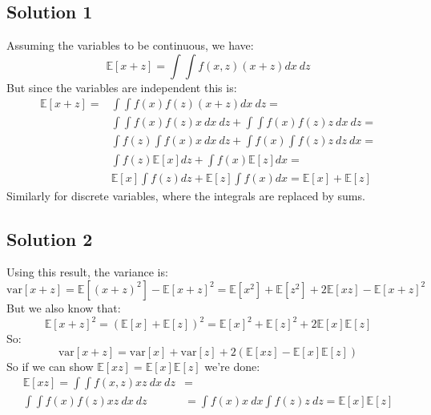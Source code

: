 \documentclass[12pt, a4paper]{article}
\numberwithin{equation}{section}
\begin{document}
\subsection{Solution 1}
Assuming the variables to be continuous, we have:
\begin{equation}
\mathbb{E}[x+z]=\int\int f(x,z)(x+z)dx\ dz
\end{equation}
But since the variables are independent this is:
\begin{align}
\mathbb{E}[x+z]=&\int\int f(x)f(z)(x+z)dx\ dz=\\
&\int\int f(x)f(z)x\ dx\ dz+\int\int f(x)f(z)z\ dx\ dz=\\
&\int f(z)\int f(x)x\ dx\ dz+\int f(x)\int f(z)z\ dz\ dx=\\
&\int f(z)\mathbb{E}[x]dz+\int f(x)\mathbb{E}[z]dx=\\
&\mathbb{E}[x]\int f(z)dz+\mathbb{E}[z]\int f(x)dx=\mathbb{E}[x]+\mathbb{E}[z]
\end{align}
Similarly for discrete variables, where the integrals are replaced by sums.

\subsection{Solution 2}
Using this result, the variance is:
\begin{equation}
\textrm{var}[x+z]=\mathbb{E}[(x+z)^2]-\mathbb{E}[x+z]^2=\mathbb{E}[x^2]+\mathbb{E}[z^2]+2\mathbb{E}[xz]-\mathbb{E}[x+z]^2
\end{equation}
But we also know that:
\begin{equation}
\mathbb{E}[x+z]^2=(\mathbb{E}[x]+\mathbb{E}[z])^2=\mathbb{E}[x]^2+\mathbb{E}[z]^2+2\mathbb{E}[x]\mathbb{E}[z]
\end{equation}
So:
\begin{equation}
\textrm{var}[x+z]=\textrm{var}[x]+\textrm{var}[z]+2(\mathbb{E}[xz]-\mathbb{E}[x]\mathbb{E}[z])
\end{equation}
So if we can show $\mathbb{E}[xz]=\mathbb{E}[x]\mathbb{E}[z]$ we're done:
\begin{align}
\mathbb{E}[xz]=\int\int f(x,z)xz\ dx\ dz&=\\
\int\int f(x)f(z)xz\ dx\ dz&=
\int f(x)x\ dx\int f(z)z\ dz=\mathbb{E}[x]\mathbb{E}[z]
\end{align}
\end{document}
